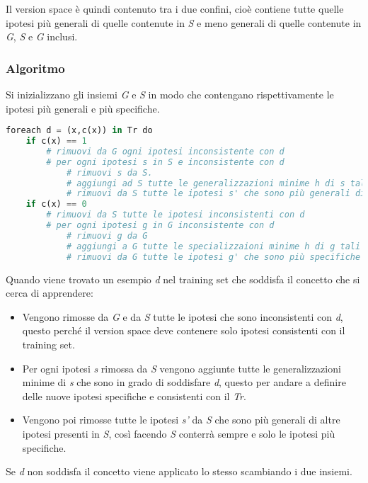 Il version space è quindi contenuto tra i due confini, cioè contiene
tutte quelle ipotesi più generali di quelle contenute in \emph{S} e meno
generali di quelle contenute in \emph{G}, \emph{S} e \emph{G} inclusi.

\subsubsection{Algoritmo}\label{algoritmo}

Si inizializzano gli insiemi \emph{G} e \emph{S} in modo che contengano
rispettivamente le ipotesi più generali e più specifiche.

\begin{lstlisting}[language=python, caption=Canditate Eliminatio]
foreach d = (x,c(x)) in Tr do
    if c(x) == 1
        # rimuovi da G ogni ipotesi inconsistente con d
        # per ogni ipotesi s in S e inconsistente con d
            # rimuovi s da S.
            # aggiungi ad S tutte le generalizzazioni minime h di s tali che sono consistenti con d ed esiste un altra ipotesi g in G più generale di h.
            # rimuovi da S tutte le ipotesi s' che sono più generali di altre ipotesi in S.
    if c(x) == 0
        # rimuovi da S tutte le ipotesi inconsistenti con d
        # per ogni ipotesi g in G inconsistente con d
            # rimuovi g da G
            # aggiungi a G tutte le specializzaioni minime h di g tali che siano consistenti con d e che esiste un'altra ipotesi s in S più specifica di h.
            # rimuovi da G tutte le ipotesi g' che sono più specifiche di altre ipotesi in G.
\end{lstlisting}

Quando viene trovato un esempio \emph{d} nel training set che soddisfa
il concetto che si cerca di apprendere:

\begin{itemize}
\item
  Vengono rimosse da \emph{G} e da \emph{S} tutte le ipotesi che sono
  inconsistenti con \emph{d}, questo perché il version space deve
  contenere solo ipotesi consistenti con il training set.
\item
  Per ogni ipotesi \emph{s} rimossa da \emph{S} vengono aggiunte tutte
  le generalizzazioni minime di \emph{s} che sono in grado di soddisfare
  \emph{d}, questo per andare a definire delle nuove ipotesi specifiche
  e consistenti con il \textit{Tr}.
\item
  Vengono poi rimosse tutte le ipotesi \emph{s'} da \emph{S} che sono
  più generali di altre ipotesi presenti in \emph{S}, così facendo
  \emph{S} conterrà sempre e solo le ipotesi più specifiche.
\end{itemize}

Se \emph{d} non soddisfa il concetto viene applicato lo stesso
scambiando i due insiemi.
